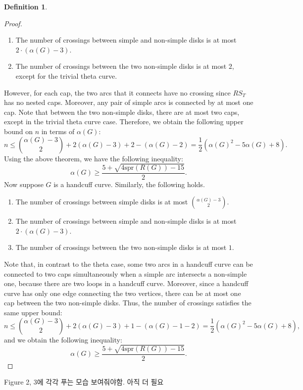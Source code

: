 \documentclass{article}
\theoremstyle{definition}
\newtheorem{defn}[thm]{Definition}
\theoremstyle{theorem}
\theoremstyle{proposition}
\theoremstyle{corollary}
\begin{document}
\begin{defn}
\begin{proof}
\begin{enumerate}
        \item The number of crossings between simple and non-simple disks is at most $2 \cdot (\alpha(G)-3)$.
        \item The number of crossings between the two non-simple disks is at most $2$, except for the trivial theta curve.
    \end{enumerate}
    However, for each cap, the two arcs that it connects have no crossing since $RS_T$ has no nested caps. Moreover, any pair of simple arcs is connected by at most one cap. Note that between the two non-simple disks, there are at most two caps, except in the trivial theta curve case. Therefore, we obtain the following upper bound on $n$ in terms of $\alpha(G)$:
    \[ n \leq \binom{\alpha(G)-3}{2} + 2(\alpha(G)-3) + 2 - (\alpha(G)-2) = \frac{1}{2} (\alpha(G)^2 - 5 \alpha(G) + 8). \]
    Using the above theorem, we have the following inequality:
    \[ \alpha(G) \geq  \frac{5+\sqrt{4\mathrm{spr}(R(G))-15}}{2}. \]
    Now suppose $G$ is a handcuff curve. Similarly, the following holds.
    \begin{enumerate}
        \item The number of crossings between simple disks is at most $\binom{\alpha(G)-3}{2}$.
        \item The number of crossings between simple and non-simple disks is at most $2 \cdot (\alpha(G)-3)$.
        \item The number of crossings between the two non-simple disks is at most $1$.
    \end{enumerate}
    Note that, in contrast to the theta case, some two arcs in a handcuff curve can be connected to two caps simultaneously when a simple arc intersects a non-simple one, because there are two loops in a handcuff curve. Moreover, since a handcuff curve has only one edge connecting the two vertices, there can be at most one cap between the two non-simple disks. Thus, the number of crossings satisfies the same upper bound:
    \[ n \leq \binom{\alpha(G)-3}{2} + 2(\alpha(G)-3) + 1 - (\alpha(G)-1-2) = \frac{1}{2} (\alpha(G)^2 - 5 \alpha(G) + 8), \]
    and we obtain the following inequality:
    \[ \alpha(G) \geq  \frac{5+\sqrt{4\mathrm{spr}(R(G))-15}}{2}. \]
\end{proof}

Figure 2, 3에 각각 푸는 모습 보여줘야함. 아직 더 필요


\end{defn}
\end{document}
